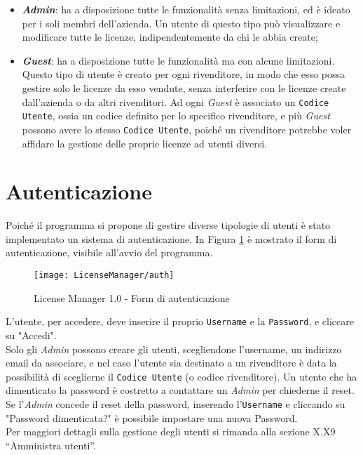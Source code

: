 \begin{itemize}
\item \textbf{\textit{Admin}}: ha a disposizione tutte le funzionalità senza limitazioni, ed è ideato per i soli membri dell’azienda. Un utente di questo tipo può visualizzare e modificare tutte le licenze, indipendentemente da chi le abbia create;

\item \textbf{\textit{Guest}}: ha a disposizione tutte le funzionalità ma con alcune limitazioni. Questo tipo di utente è creato per ogni rivenditore, in modo che esso possa gestire solo le licenze da esso vendute, senza interferire con le licenze create dall’azienda o da altri rivenditori. Ad ogni \textit{Guest} è associato un \texttt{Codice Utente}, ossia un codice definito per lo specifico rivenditore, e più \textit{Guest} possono avere lo stesso \texttt{Codice Utente}, poiché un rivenditore potrebbe voler affidare la gestione delle proprie licenze ad utenti diversi.
\end{itemize}


\section{Autenticazione}
Poiché il programma si propone di gestire diverse tipologie di utenti è stato implementato un sistema di autenticazione. In Figura \ref{auth} è mostrato il form di autenticazione, visibile all'avvio del programma.

\begin{figure}[!h] 
    \centering 
    \texttt{[image: LicenseManager/auth]} 
    \caption{License Manager 1.0 - Form di autenticazione}
    \label{auth}
\end{figure}

L’utente, per accedere, deve inserire il proprio \texttt{Username} e la \texttt{Password}, e cliccare su "Accedi".\\
Solo gli \textit{Admin} possono creare gli utenti, scegliendone l’username, un indirizzo email da associare, e nel caso l’utente sia destinato a un rivenditore è data la possibilità di sceglierne il \texttt{Codice Utente} (o codice rivenditore).
Un utente che ha dimenticato la password è costretto a contattare un \textit{Admin} per chiederne il reset. Se l’\textit{Admin} concede il reset della password, inserendo l’\texttt{Username} e cliccando su "Password dimenticata?" è possibile impostare una nuova Password.\\
Per maggiori dettagli sulla gestione degli utenti si rimanda alla sezione X.X9 “Amministra utenti”.
\newpage



